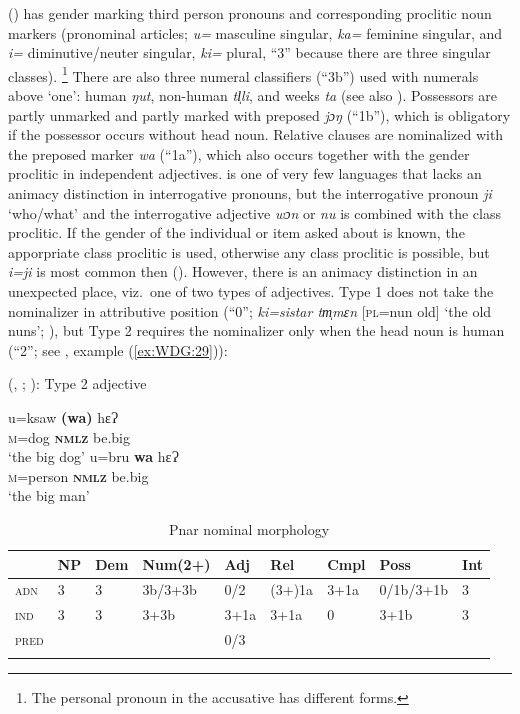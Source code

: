 \documentclass[output=collectionpaper]{langsci/langscibook}
\begin{document}
 (\citealt{Ring2015}) has gender marking third person pronouns and corresponding proclitic noun markers (pronominal articles; \textit{u=} masculine singular, \textit{ka=} feminine singular, and \textit{i=} diminutive/neuter singular, \textit{ki=} plural, ``3'' because there are three singular classes).%
\footnote{%
The personal pronoun in the accusative has different forms.
} %
There are also three numeral classifiers (``3b'') used with numerals above `one': human \textit{ŋut}, non-human \textit{tl̩li}, and weeks \textit{ta} (see also ). Possessors are partly unmarked and partly marked with preposed \textit{jɔŋ} (``1b''), which is obligatory if the possessor occurs without head noun. Relative clauses are nominalized with the preposed marker \textit{wa} (``1a''), which also occurs \textendash{} together with the gender proclitic \textendash{} in independent adjectives.  is one of very few languages that lacks an animacy distinction in interrogative pronouns, but the interrogative pronoun \textit{ji} `who/what' and the interrogative adjective \textit{wɔn} or \textit{nu} is combined with the class proclitic. If the gender of the individual or item asked about is known, the apporpriate class proclitic is used, otherwise any class proclitic is possible, but \textit{i=ji} is most common then (\citealt[235]{Ring2015}). However, there is an animacy distinction in an unexpected place, viz.\ one of two types of adjectives. Type 1 does not take the nominalizer in attributive position (``0''; \textit{ki=sistar tm̩mɛn} [\textsc{pl}=nun old] `the old nuns'; \citealt[173]{Ring2015}), but Type 2 requires the nominalizer only when the head noun is human (``2''; see , example (\ref{ex:WDG:29})):

\ea\label{ex:WDG:29}
 (, ; \citealt[177]{Ring2015}): Type 2 adjective\\
\begin{xlist}
\ex
\gll	u=ksaw	\textbf{(wa)}	hɛɁ \\
		\textsc{m}=dog 	\textbf{\textsc{nmlz}}	be.big\\
\glt		`the big dog'
\ex
\gll u=bru 	\textbf{wa} 	hɛɁ \\
		\textsc{m}=person 	\textbf{\textsc{nmlz}} 	be.big\\
\glt		`the big man'
\end{xlist}
\z

\begin{table}
\caption{Pnar nominal morphology}
\begin{tabular}{>{\scshape}l*{8}{l}}
\lsptoprule
&	NP	&	Dem	&	Num(2+)	&	Adj	&	Rel	&	Cmpl	&	Poss	&	Int	\\
\midrule
adn	&	3	&	3	&	3b/3+3b	&	0/2	&	(3+)1a	&	3+1a	&	0/1b/3+1b	&	3	\\
ind	&	3	&	3	&	3+3b	&	3+1a	&	3+1a	&	0	&	3+1b	&	3	\\
pred	&		&		&		&	0/3	&		&		&		&		\\
\lspbottomrule
\end{tabular}
\label{tab:WDG:11}
\end{table}
\end{document}
